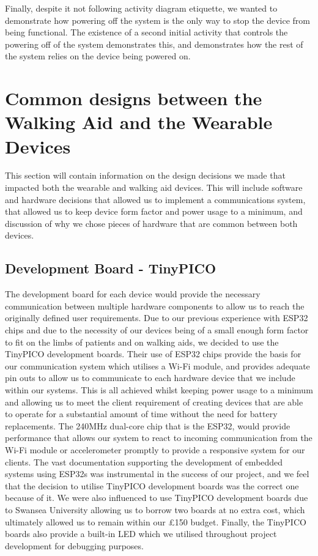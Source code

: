                 Finally, despite it not following activity diagram etiquette, we wanted to demonstrate how powering off the system is the only way to stop the device from being functional. The existence of a second initial activity that controls the powering off of the system demonstrates this, and demonstrates how the rest of the system relies on the device being powered on.

    \section{Common designs between the Walking Aid and the Wearable Devices}
    \label{sec:both_devices}

        This section will contain information on the design decisions we made that impacted both the wearable and walking aid devices. This will include software and hardware decisions that allowed us to implement a communications system, that allowed us to keep device form factor and power usage to a minimum, and discussion of why we chose pieces of hardware that are common between both devices.

        \subsection{Development Board - TinyPICO}
        \label{subsec:development_board}

            The development board for each device would provide the necessary communication between multiple hardware components to allow us to reach the originally defined user requirements. Due to our previous experience with ESP32 chips and due to the necessity of our devices being of a small enough form factor to fit on the limbs of patients and on walking aids, we decided to use the TinyPICO development boards. Their use of ESP32 chips provide the basis for our communication system which utilises a Wi-Fi module, and provides adequate pin outs to allow us to communicate to each hardware device that we include within our systems. This is all achieved whilst keeping power usage to a minimum and allowing us to meet the client requirement of creating devices that are able to operate for a substantial amount of time without the need for battery replacements. The 240MHz dual-core chip that is the ESP32, would provide performance that allows our system to react to incoming communication from the Wi-Fi module or accelerometer promptly to provide a responsive system for our clients. The vast documentation supporting the development of embedded systems using ESP32s was instrumental in the success of our project, and we feel that the decision to utilise TinyPICO development boards was the correct one because of it. We were also influenced to use TinyPICO development boards due to Swansea University allowing us to borrow two boards at no extra cost, which ultimately allowed us to remain within our £150 budget. Finally, the TinyPICO boards also provide a built-in LED which we utilised throughout project development for debugging purposes.


